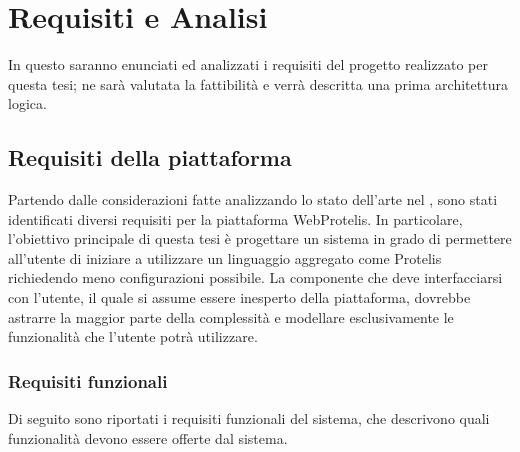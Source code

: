 \chapter{Requisiti e Analisi}\label{ch:requirements}
  In questo  saranno enunciati ed analizzati i requisiti del progetto realizzato per questa tesi;
  ne sarà valutata la fattibilità e verrà descritta una prima architettura logica.

  \section{Requisiti della piattaforma}
    Partendo dalle considerazioni fatte analizzando lo stato dell'arte nel , sono stati identificati diversi requisiti per la piattaforma WebProtelis.
    In particolare, l'obiettivo principale di questa tesi è progettare un sistema in grado di permettere all'utente di iniziare a utilizzare un linguaggio aggregato come Protelis richiedendo meno configurazioni possibile.
    La componente che deve interfacciarsi con l'utente, il quale si assume essere inesperto della piattaforma, dovrebbe astrarre la maggior parte della complessità e modellare esclusivamente le funzionalità che l'utente potrà utilizzare.

    \subsection{Requisiti funzionali}\label{subsec:req:fun}
      Di seguito sono riportati i requisiti funzionali del sistema, che descrivono quali funzionalità devono essere offerte dal sistema.


